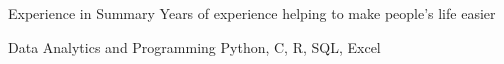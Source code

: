 

\begin{cvskills}
  \cvskill
    {Experience in Summary} %
    {Years of experience helping to make people's life easier} %

  \cvskill
    {Data Analytics and Programming} %
    {Python, C, R, SQL, Excel} %

\end{cvskills}
